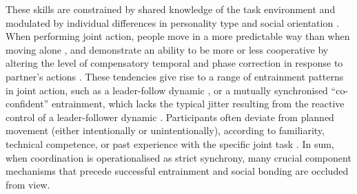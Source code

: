 \begin{CJK}{UTF8}{gbsn}
These skills are constrained by shared knowledge of the task environment \citep{Vesper2017} and modulated by individual differences in personality type and social orientation \citep{Marsh2009,Keller2014}.  When performing joint action, people move in a more predictable way than when moving alone \citep{Vesper2011}, and demonstrate an ability to be more or less cooperative by altering the level of compensatory temporal and phase correction in response to partner's actions \citep{Repp2008}.  These tendencies give rise to a range of entrainment patterns in joint action, such as a leader-follow dynamic \citep[usually in situations where there is a skill disparity between participants,][]{Fairhurst2014}, or a mutually synchronised ``co-confident'' entrainment, which lacks the typical jitter resulting from the reactive control of a leader-follower dynamic \citep{Noy2011,Noy2015}.  Participants often deviate from planned movement (either intentionally or unintentionally), according to familiarity, technical competence, or past experience with the specific joint task \citep{Goebl2009}.  In sum, when coordination is operationalised as strict synchrony, many crucial component mechanisms that precede successful entrainment and social bonding are occluded from view.



\end{CJK}
